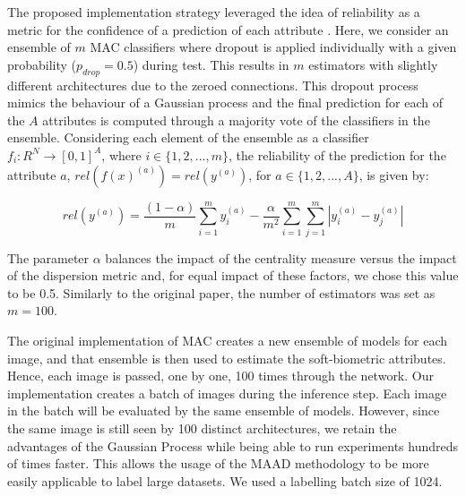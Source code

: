 \documentclass[a4paper, 10pt, conference]{ieeeconf}      %
\begin{document}
The proposed implementation strategy leveraged the idea of reliability as a metric for the confidence of a prediction of each attribute \cite{terhorst2019reliable}. Here, we consider an ensemble of $m$ MAC classifiers where dropout is applied individually with a given probability ($p_{drop}=0.5$) during test. This results in $m$ estimators with slightly different architectures due to the zeroed connections. This dropout process mimics the behaviour of a Gaussian process and the final prediction for each of the $A$ attributes is computed through a majority vote of the classifiers in the ensemble. Considering each element of the ensemble as a classifier $f_{i}:R^N \rightarrow [0,1]^A$, where $i\in\{1,2,...,m\}$, the reliability of the prediction for the attribute $a$,  $rel(f(x)^{(a)})=rel(y^{(a)})$, for $a\in\{1,2,...,A\}$, is given by:


\begin{equation}
    rel(y^{(a)}) = \frac{(1- \alpha)}{m} \sum_{i=1}^{m} y_{i}^{(a)} - \frac{\alpha}{m^2} \sum_{i=1}^{m}  \sum_{j=1}^{m} |y_{i}^{(a)}-y_{j}^{(a)}|
    \label{Rel}
\end{equation}

The parameter $\alpha$ balances the impact of the centrality measure versus the impact of the dispersion metric and, for equal impact of these factors, we chose this value to be 0.5. Similarly to the original paper, the number of estimators was set as $m=100$. 


The original implementation of MAC creates a new ensemble of models for each image, and that ensemble is then used to estimate the soft-biometric attributes. Hence, each image is passed, one by one, 100 times through the network. Our implementation creates a batch of images during the inference step. Each image in the batch will be evaluated by the same ensemble of models. However, since the same image is still seen by 100 distinct architectures, we retain the advantages of the Gaussian Process while being able to run experiments hundreds of times faster.  This allows the usage of the MAAD methodology to be more easily applicable to label large datasets. We used a labelling batch size of 1024.
\end{document}
